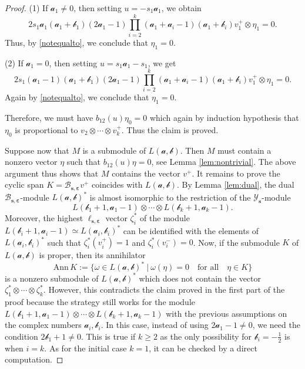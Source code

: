 \documentclass[11pt,reqno]{amsart}
\numberwithin{equation}{section}
\theoremstyle{definition}
\theoremstyle{remark}
\newcommand{\mc}{\mathcal}
\newcommand{\gge}{\geqslant}
\newcommand{\YMN}{{\mathscr{Y}_{\bm s}}}
\newcommand{\BMN}{{\mathscr{B}_{\bm s,\bm \ve}}}
\newcommand{\ve}{\varepsilon}
\newcommand{\s}{{\bm s}}
\begin{document}
\begin{proof}
(1) If $\mc a_1\ne 0$, then setting $u=-s_1\mc a_1$, we obtain
\[
2s_1\mc a_1(\mc a_1+\mc b_1)(2\mc a_1-1)\prod_{i=2}^k(\mc a_1+\mc a_i-1)(\mc a_1+\mc b_i)v_1^+\otimes \eta_1=0.
\]
Thus, by \eqref{notequalto}, we conclude that $\eta_1=0$.

(2) If $\mc a_1=0$, then setting $u=s_1\mc a_1-s_1$, we get
\[
2s_1(\mc a_1-1)(\mc a_1+\mc b_1)(2\mc a_1-1)\prod_{i=2}^k(\mc a_1+\mc a_i-1)(\mc a_1+\mc b_i)v_1^+\otimes \eta_1=0.
\]
Again by \eqref{notequalto}, we conclude that $\eta_1=0$.

Therefore, we must have $b_{12}(u)\eta_0=0$ which again by induction hypothesis that $\eta_0$ is proportional to $v_2\otimes\cdots\otimes v_k^+$. Thus the claim is proved.

Suppose now that $M$ is a submodule of $L(\bm{\mc a,\mc b})$. Then $M$ must contain a nonzero vector $\eta$ such that $b_{12}(u)\eta=0$, see Lemma \ref{lem:nontrivial}. The above argument thus shows that $M$ contains the vector $v^+$. It remains to prove the cyclic span $K=\BMN v^+$ coincides with $L(\bm{\mc a,\mc b})$. By Lemma \ref{lem:dual}, the dual $\BMN$-module $L(\bm{\mc a,\mc b})^*$ is almost isomorphic to the restriction of the $\YMN$-module
\[
L(\mc b_1+1,\mc a_1-1)\otimes \cdots\otimes L(\mc b_k+1,\mc a_k-1).
\]
Moreover, the highest $\ell_{\s,\bm\ve}$ vector $\zeta_i^*$ of the module $L(\mc b_i+1,\mc a_i-1)\simeq L(\mc a_i,\mc b_i)^*$ can be identified with the elements of $L(\mc a_i,\mc b_i)^*$ such that $\zeta_i^*(v_i^+)=1$ and $\zeta_i^*(v_i^-)=0$. Now, if the submodule $K$ of $L(\bm{\mc a,\mc b})$ is proper, then its annihilator
\[
\mathrm{Ann}\,K:=\{\omega\in L(\bm{\mc a,\mc b})^*~|~\omega(\eta)=0 \quad\text{for all}\quad \eta\in K \}
\]
is a nonzero submodule of $L(\bm{\mc a,\mc b})^*$ which does not contain the vector $\zeta_1^*\otimes\cdots\otimes \zeta_k^*$. However, this contradicts the claim proved in the first part of the proof because the strategy still works for the module $L(\mc b_1+1,\mc a_1-1)\otimes \cdots\otimes L(\mc b_k+1,\mc a_k-1)$ with the previous assumptions on the complex numbers $\mc a_i,\mc b_i$. In this case, instead of using $2\mc a_1-1\ne 0$, we need the condition $2\mc b_1+1\ne 0$. This is true if $k\gge 2$ as the only possibility for $\mc b_i=-\frac12$ is when $i=k$. As for the initial case $k=1$, it can be checked by a direct computation.
\end{proof}
\end{document}
